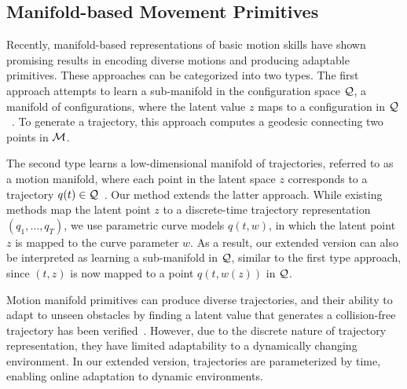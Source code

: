 \subsection{Manifold-based Movement Primitives}
Recently, manifold-based representations of basic motion skills have shown promising results in encoding diverse motions and producing adaptable primitives. These approaches can be categorized into two types. The first approach attempts to learn a sub-manifold in the configuration space ${\cal Q}$, a manifold of configurations, where the latent value $z$ maps to a configuration in ${\cal Q}$~\cite{beik2021learning}. To generate a trajectory, this approach computes a geodesic connecting two points in ${\cal M}$. 

The second type learns a low-dimensional manifold of trajectories, referred to as a motion manifold, where each point in the latent space $z$ corresponds to a trajectory $q(t) \in {\cal Q}$~\cite{noseworthy2020task,lee2023equivariant}.
Our method extends the latter approach. 
While existing methods map the latent point $z$ to a discrete-time trajectory representation $(q_1,\ldots, q_T)$, we use parametric curve models $q(t, w)$, in which the latent point $z$ is mapped to the curve parameter $w$. 
As a result, our extended version can also be interpreted as learning a sub-manifold in ${\cal Q}$, similar to the first type approach, since $(t,z)$ is now mapped to a point $q(t, w(z))$ in ${\cal Q}$.

Motion manifold primitives can produce diverse trajectories, and their ability to adapt to unseen obstacles by finding a latent value that generates a collision-free trajectory has been verified~\cite{lee2023equivariant}. However, due to the discrete nature of trajectory representation, they have limited adaptability to a dynamically changing environment. In our extended version, trajectories are parameterized by time, enabling online adaptation to dynamic environments. 


